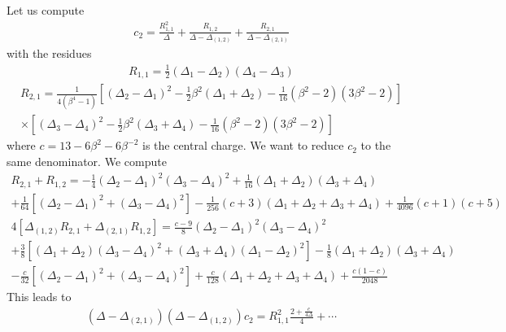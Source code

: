 \documentclass[12pt,a4paper]{article}
\begin{document}
Let us compute 
\begin{align}
 c_2 = \frac{R_{1,1}^2}{\Delta} +\frac{R_{1,2}}{\Delta-\Delta_{(1,2)}} + \frac{R_{2,1}}{\Delta-\Delta_{(2,1)}}
\end{align}
with the residues 
\begin{align}
 R_{1,1} = \tfrac12 (\Delta_1-\Delta_2)(\Delta_4-\Delta_3) 
 \end{align}
 \begin{multline}
   R_{2,1} = \frac{1}{4(\beta^4-1)}\left[(\Delta_2-\Delta_1)^2 -\tfrac12 \beta^2(\Delta_1+\Delta_2) -\tfrac{1}{16}(\beta^2-2)(3\beta^2-2)\right] 
   \\
\times \left[(\Delta_3-\Delta_4)^2 -\tfrac12 \beta^2(\Delta_3+\Delta_4) -\tfrac{1}{16}(\beta^2-2)(3\beta^2-2)\right] 
 \end{multline}
 where $c=13-6\beta^2-6\beta^{-2}$ is the central charge. 
We want to reduce $c_2$ to the same denominator. We compute 
\begin{multline}
 R_{2,1}+R_{1,2} = -\frac14 (\Delta_2-\Delta_1)^2(\Delta_3-\Delta_4)^2 +\frac{1}{16}(\Delta_1+\Delta_2)(\Delta_3+\Delta_4) 
 \\
 +\frac{1}{64} \left[(\Delta_2-\Delta_1)^2+(\Delta_3-\Delta_4)^2\right] -\frac{1}{256}(c+3)(\Delta_1+\Delta_2+\Delta_3+\Delta_4) + \frac{1}{4096}(c+1)(c+5)
\end{multline}
\begin{multline}
 4\left[\Delta_{(1,2)}R_{2,1}+\Delta_{(2,1)}R_{1,2}\right] = \frac{c-9}{8} (\Delta_2-\Delta_1)^2(\Delta_3-\Delta_4)^2 
 \\
 +\frac38 \left[(\Delta_1+\Delta_2)(\Delta_3-\Delta_4)^2+(\Delta_3+\Delta_4)(\Delta_1-\Delta_2)^2\right] 
 -\frac18(\Delta_1+\Delta_2)(\Delta_3+\Delta_4) 
 \\
 -\frac{c}{32}\left[(\Delta_2-\Delta_1)^2+(\Delta_3-\Delta_4)^2\right] +\frac{c}{128}(\Delta_1+\Delta_2+\Delta_3+\Delta_4) + \frac{c(1-c)}{2048}
\end{multline}
This leads to 
\begin{multline}
 (\Delta-\Delta_{(2,1)})(\Delta-\Delta_{(1,2)}) c_2 = R_{1,1}^2\frac{2+\frac{c}{4\Delta}}{4} + \cdots \\
\end{multline}








\end{document}
